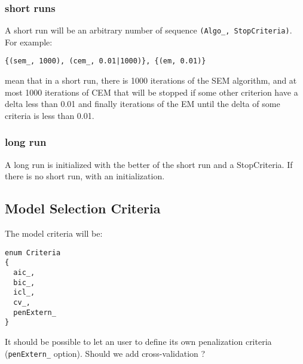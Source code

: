 \documentclass[a4paper,11pt]{article}
\begin{document}
\subsubsection{short runs}

A short run will be an arbitrary number of sequence \verb+(Algo_, StopCriteria)+. For example:
\begin{verbatim}
{(sem_, 1000), (cem_, 0.01|1000)}, {(em, 0.01)}
\end{verbatim}
mean that in a short run, there is 1000 iterations of the SEM algorithm, and at most 1000 iterations
of CEM that will be stopped  if some other criterion have a delta less than 0.01 and finally iterations of the EM
until the delta of some criteria is less than 0.01.

\subsubsection{long run}

A long run is initialized with the better of the short run and a StopCriteria.
If there is no short run, with an initialization.

\subsection{Model Selection Criteria}
The model criteria will be:
\begin{verbatim}
enum Criteria
{
  aic_,
  bic_,
  icl_,
  cv_,
  penExtern_
}
\end{verbatim}
It should be possible to let an user to define its own penalization criteria (\verb+penExtern_+ option).
Should we add cross-validation ?
\end{document}
